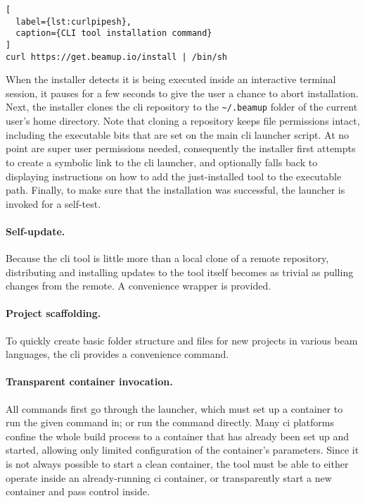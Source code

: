 \begin{lstlisting}[
  label={lst:curlpipesh},
  caption={CLI tool installation command}
]
curl https://get.beamup.io/install | /bin/sh
\end{lstlisting}

When the installer detects it is being executed inside an interactive terminal session, it pauses for a few seconds to give the user a chance to abort installation. Next, the installer clones the \acrshort{cli} repository to the \lstinline|~/.beamup| folder of the current user's home directory. Note that cloning a repository keeps file permissions intact, including the executable bits that are set on the main \acrshort{cli} launcher script. At no point are super user permissions needed, consequently the installer first attempts to create a symbolic link to the \acrshort{cli} launcher, and optionally falls back to displaying instructions on how to add the just-installed tool to the executable path. Finally, to make sure that the installation was successful, the launcher is invoked for a self-test.

\paragraph{Self-update.} Because the \acrshort{cli} tool is little more than a local clone of a remote repository, distributing and installing updates to the tool itself becomes as trivial as pulling changes from the remote. A convenience wrapper is provided.

\paragraph{Project scaffolding.} To quickly create basic folder structure and files for new projects in various \acrshort{beam} languages, the \acrshort{cli} provides a convenience command.

\paragraph{Transparent container invocation.} All commands first go through the launcher, which must set up a container to run the given command in; or run the command directly. Many \acrshort{ci} platforms confine the whole build process to a container that has already been set up and started, allowing only limited configuration of the container's parameters. Since it is not always possible to start a clean container, the tool must be able to either operate inside an already-running \acrshort{ci} container, or transparently start a new container and pass control inside.

